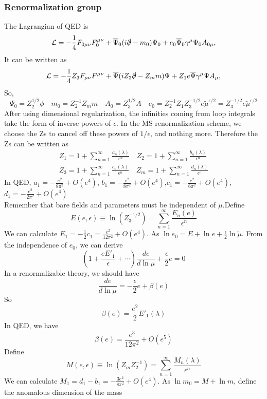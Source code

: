 \subsubsection{Renormalization group}
\noindent
The Lagrangian of QED is
\[\mathcal{L} = -\frac{1}{4}F_{0\mu\nu}F_0^{\mu\nu} + \overline{\Psi}_0 (i\slashed{\partial}-m_0) \Psi_0 + e_0\overline{\Psi}_0\gamma^{\mu}\Psi_0 A_{0\mu}, \]
It can be written as
\[\mathcal{L} = -\frac{1}{4} Z_3 F_{\mu\nu}F^{\mu\nu} + \overline{\Psi} (iZ_2 \slashed{\partial}-Z_m m) \Psi + Z_1 e\overline{\Psi}\gamma^{\mu}\Psi A_{\mu}, \]
So,
\[\Psi_0 = Z_{2}^{1/2}\phi \quad m_0 = Z_{2}^{-1} Z_{m}m \quad A_0 = Z_3^{1/2}A \quad e_0 = Z_{2}^{-1}Z_1 Z_{3}^{-1/2} e \tilde{\mu}^{\epsilon/2} = Z_{3}^{-1/2} e \tilde{\mu}^{\epsilon/2}\]
After using dimensional regularization, the infinities coming from loop integrals take the form of inverse powers of $\epsilon$. In the  $\mathrm{\overline{MS}}$ renormalization scheme, we choose the Zs to cancel off these powers of $1/\epsilon$, and nothing more. Therefore the Zs can be written as
\begin{eqnarray}
Z_{1} = 1 + \sum_{n=1}^{\infty} \frac{a_n(\lambda)}{\epsilon^n} \quad Z_{2} = 1 + \sum_{n=1}^{\infty} \frac{b_n(\lambda)}{\epsilon^n} \nonumber \\
Z_{3} = 1 + \sum_{n=1}^{\infty} \frac{c_n(\lambda)}{\epsilon^n} \quad Z_{m} = 1 + \sum_{n=1}^{\infty} \frac{d_n(\lambda)}{\epsilon^n} \nonumber 
\end{eqnarray}
In QED, $a_1 = -\frac{e^2}{8\pi^2} + O(e^4)$, $b_1 = -\frac{e^2}{8\pi^2} + O(e^4)$,$c_1 = -\frac{e^2}{6\pi^2} + O(e^4)$,$d_1 = -\frac{e^2}{2\pi^2} + O(e^4)$\\
Remember that bare fields and parameters must be independent of $\mu$.Define
\[E(e,\epsilon) \equiv \ln(Z_3^{-1/2}) = \sum_{n=1}^{\infty} \frac{E_n(e)}{\epsilon^n}\]
We can calculate $E_1 = -\frac{1}{2}c_1 = \frac{e^2}{12\pi^2} + O(e^4)$.
As $\ln e_0 = E + \ln e + \frac{\epsilon}{2} \ln \tilde{\mu} $. From the independence of $e_0$, we can derive
\[\left ( 1 + \frac{e E'_1}{\epsilon} + \cdots \right) \frac{d e}{d\ln \mu} + \frac{\epsilon}{2} e = 0\]
In a renormalizable theory, we should have
\[\frac{d e}{d\ln\mu} = -\frac{\epsilon}{2} e + \beta(e)\]
So
\[\beta(e) = \frac{e^2}{2} E'_1(\lambda)\]
In QED, we have
\[\beta(e) = \frac{e^3}{12\pi^2} + O(e^5)\]
Define
\[M(e,\epsilon) \equiv \ln(Z_{m} Z_{2}^{-1}) = \sum_{n=1}^{\infty} \frac{M_n(\lambda)}{\epsilon^n}\]
We can calculate $M_1 = d_1 - b_1 = -\frac{3e^2}{8\pi^2} + O(e^4)$.
As $\ln m_0 = M + \ln m $, define the anomalous dimension of the mass
